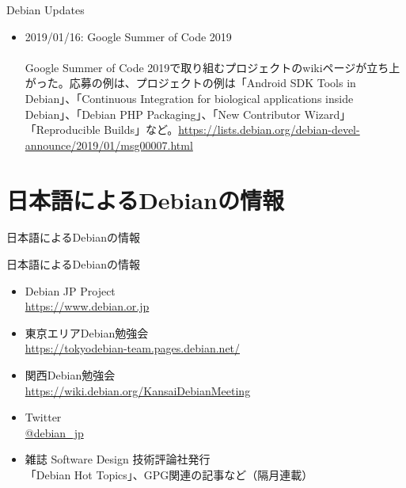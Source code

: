 \begin{frame}{Debian Updates}%

\begin{itemize}
\item 2019/01/16: Google Summer of Code 2019\\
\ \\
\small{Google Summer of Code 2019で取り組むプロジェクトのwikiページが立ち上がった。応募の例は、プロジェクトの例は「Android SDK Tools in Debian」、「Continuous Integration for biological applications inside Debian」、「Debian PHP Packaging」、「New Contributor Wizard」「Reproducible Builds」など。\url{https://lists.debian.org/debian-devel-announce/2019/01/msg00007.html}}

\end{itemize}

\end{frame}



\section{日本語によるDebianの情報}

\begin{frame}\begin{center}\Huge{日本語によるDebianの情報}\end{center}\end{frame}

\begin{frame}{日本語によるDebianの情報}
\begin{itemize}
  \item Debian JP Project \\
      \url{https://www.debian.or.jp}
  \item 東京エリアDebian勉強会\\
      \url{https://tokyodebian-team.pages.debian.net/}
  \item 関西Debian勉強会 \\
      \url{https://wiki.debian.org/KansaiDebianMeeting}
  \item Twitter \\
      \url{@debian_jp}
  \item  雑誌 Software Design 技術評論社発行 \\
    「Debian Hot Topics」、GPG関連の記事など（隔月連載）
\end{itemize}
\end{frame}

